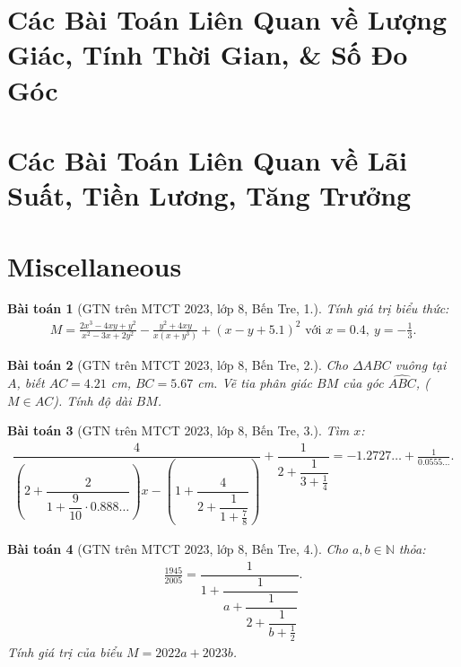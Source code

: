 \documentclass{article}
\newtheorem{baitoan}{Bài toán}
\begin{document}

\section{Các Bài Toán Liên Quan về Lượng Giác, Tính Thời Gian, \& Số Đo Góc}


\section{Các Bài Toán Liên Quan về Lãi Suất, Tiền Lương, Tăng Trưởng}


\section{Miscellaneous}

\begin{baitoan}[GTN trên MTCT 2023, lớp 8, Bến Tre, 1.]
	Tính giá trị biểu thức:
	\begin{align*}
		M = \frac{2x^3 - 4xy + y^2}{x^2 - 3x + 2y^2} - \frac{y^2 + 4xy}{x(x + y^3)} + (x - y + 5.1)^2\mbox{ với } x = 0.4,\ y = -\frac{1}{3}.
	\end{align*}
\end{baitoan}

\begin{baitoan}[GTN trên MTCT 2023, lớp 8, Bến Tre, 2.]
	Cho $\Delta ABC$ vuông tại $A$, biết $AC = 4.21$ \emph{cm}, $BC = 5.67$ \emph{cm}. Vẽ tia phân giác $BM$ của góc $\widehat{ABC}$, ($M\in AC$). Tính độ dài $BM$.
\end{baitoan}

\begin{baitoan}[GTN trên MTCT 2023, lớp 8, Bến Tre, 3.]
	Tìm $x$:
	\begin{align*}
		\dfrac{4}{\left(2 + \dfrac{2}{1 + \dfrac{9}{10}\cdot0.888\ldots}\right)x - \left(1 + \dfrac{4}{2 + \dfrac{1}{1 + \frac{7}{8}}}\right)} + \dfrac{1}{2 + \dfrac{1}{3 + \frac{1}{4}}} = -1.2727\ldots + \frac{1}{0.0555\ldots}.
	\end{align*}
\end{baitoan}

\begin{baitoan}[GTN trên MTCT 2023, lớp 8, Bến Tre, 4.]
	Cho $a,b\in\mathbb{N}$ thỏa:
	\begin{align*}
		\frac{1945}{2005} = \dfrac{1}{1 + \dfrac{1}{a + \dfrac{1}{2 + \dfrac{1}{b + \frac{1}{2}}}}}.
	\end{align*}
	Tính giá trị của biểu $M = 2022a + 2023b$.
\end{baitoan}
\end{document}
